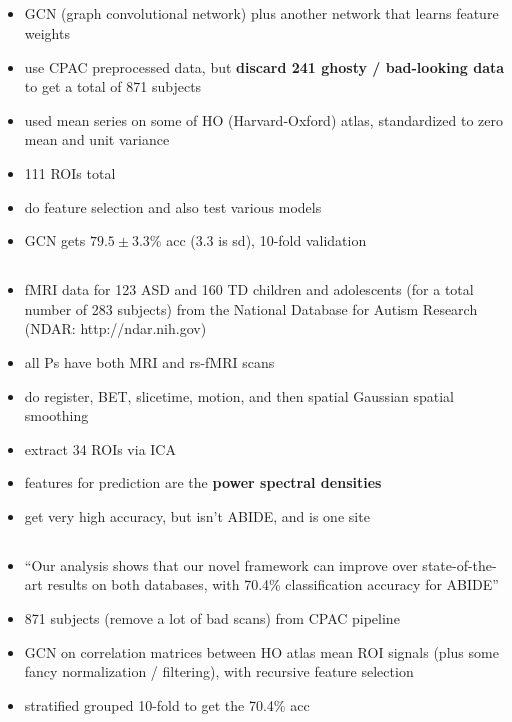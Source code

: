 \documentclass[10pt]{article}
\begin{document}
\subsection{\citet{shaoClassificationASDBased2021}}

\begin{itemize}
  \item GCN (graph convolutional network) plus another network that learns feature weights
  \item use CPAC preprocessed data, but \textbf{discard 241 ghosty / bad-looking data} to get a
  total of 871 subjects
  \item used mean series on some of HO (Harvard-Oxford) atlas, standardized to zero mean and unit variance
  \item 111 ROIs total
  \item do feature selection and also test various models
  \item GCN gets \(79.5\pm3.3\)\% acc (3.3 is sd), 10-fold validation
\end{itemize}

\subsection{\citet{dekhilUsingRestingState2018}}
\begin{itemize}
  \item  fMRI data for 123 ASD and 160 TD children and adolescents (for a total number of 283
  subjects) from the National Database for Autism Research (NDAR: http://ndar.nih.gov)
  \item all Ps have both MRI and rs-fMRI scans
  \item do register, BET, slicetime, motion, and then spatial Gaussian spatial smoothing
  \item extract 34 ROIs via ICA
  \item features for prediction are the \textbf{power spectral densities}
  \item get very high accuracy, but isn't ABIDE, and is one site
\end{itemize}

\subsection{\citet{parisotDiseasePredictionUsing2018}}
\begin{itemize}
  \item ``Our analysis shows that our novel framework can improve over state-of-the-art results on
  both databases, with 70.4\% classification accuracy for ABIDE''
  \item 871 subjects (remove a lot of bad scans) from CPAC pipeline
  \item GCN on correlation matrices between HO atlas mean ROI signals (plus some fancy normalization
  / filtering), with recursive feature selection
  \item stratified grouped 10-fold to get the 70.4\% acc
\end{itemize}
\end{document}
